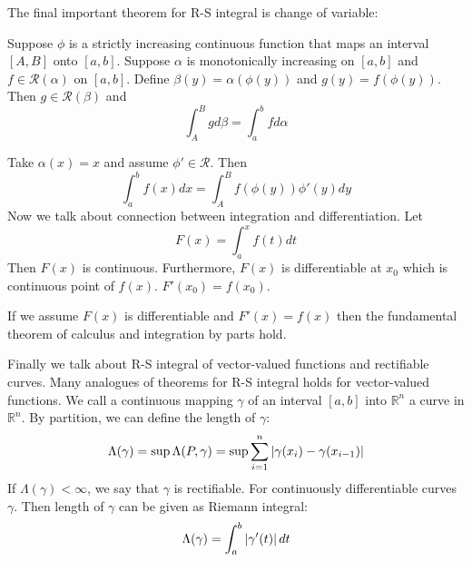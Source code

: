 The final important theorem for R-S integral is change of variable:
\begin{theorem}
    Suppose $\phi$ is a strictly increasing continuous function that maps an interval $[A,B]$ onto $[a,b]$. Suppose $\alpha$ is monotonically increasing on $[a,b]$ and $f\in\mathscr{R}(\alpha)$ on $[a,b]$. Define $\beta(y)=\alpha(\phi(y))$ and $g(y)=f(\phi(y))$. Then $g\in\mathscr{R}(\beta)$ and 
    \begin{equation*}
        \int_{A}^{B}g d\beta=\int_{a}^{b}f d\alpha
    \end{equation*}
\end{theorem}
Take $\alpha(x)=x$ and assume $\phi'\in\mathscr{R}$. Then
\begin{equation*}
    \int_{a}^{b}f(x) dx=\int_{A}^{B}f(\phi(y))\phi'(y)dy
\end{equation*}
Now we talk about connection between integration and differentiation. Let
\begin{equation*}
    F(x)=\int_{a}^{x}f(t)dt
\end{equation*}
Then $F(x)$ is continuous. Furthermore, $F(x)$ is differentiable at $x_0$ which is continuous point of $f(x)$. $F'(x_0)=f(x_0)$.\par
If we assume $F(x)$ is differentiable and $F'(x)=f(x)$ then the fundamental theorem of calculus and integration by parts hold.\par
Finally we talk about R-S integral of vector-valued functions and rectifiable curves. Many analogues of theorems for R-S integral holds for vector-valued functions. We call a continuous mapping $\gamma$ of an interval $[a,b]$ into $\mathbb{R}^n$ a curve in $\mathbb{R}^n$. By partition, we can define the length of $\gamma$:
\begin{equation*}
    \Lambda(\gamma)=\sup\Lambda(P,\gamma)=\sup \sum_{i=1}^n\left\lvert\gamma(x_i)-\gamma(x_{i-1})\right\rvert
\end{equation*}
If $\Lambda(\gamma)<\infty$, we say that $\gamma$ is rectifiable. For continuously differentiable curves $\gamma$. Then length of $\gamma$ can be given as Riemann integral:
\begin{equation*}
    \Lambda(\gamma)=\int_{a}^{b}\left\lvert\gamma'(t)\right\rvert dt
\end{equation*}
% 